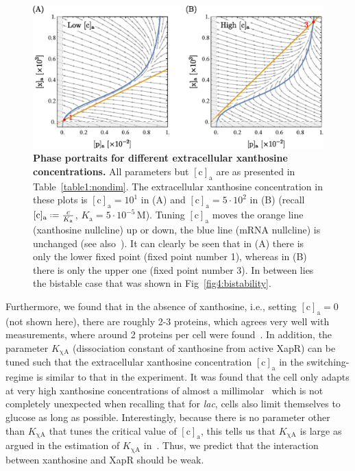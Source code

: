 \documentclass[10pt,letterpaper]{article}
\newcommand{\unit}[1]{\,\mathrm{#1}}
\newcommand{\n}[1]{\mathrm{#1}}
\newcommand*{\defeq}{\mathrel{\vcenter{\baselineskip0.5ex \lineskiplimit0pt
			\hbox{\scriptsize.}\hbox{\scriptsize.}}}%
	=}
\begin{document}
\begin{figure}%
	\centering
	\includegraphics[width=1\textwidth]{media/VaryingC.eps}
	\caption{{\bf Phase portraits for different extracellular xanthosine concentrations.}
		All parameters but $\n{[c]_a}$ are as presented in
		Table~\ref{table1:nondim}. The extracellular xanthosine
		concentration in these plots is $\n{[c]_a}=10^{1}$ in (A) and
		$\n{[c]_a}= 5 \cdot 10^{2}$ in (B) (recall $\n{[c]_{a}} \defeq
		\frac{c}{K_{\n{a}}}$, $K_{\n{a}} = 5 \cdot 10^{-5} \unit{M}$).
		Tuning $\n{[c]_a}$ moves the orange line (xanthosine nullcline) up
		or down, the blue line (mRNA nullcline) is unchanged (see
		also~). It can clearly be seen that in (A) there is
		only the lower fixed point (fixed point number 1), whereas in (B)
		there is only the upper one (fixed point number 3). In between lies
		the bistable case that was shown in Fig~\ref{fig4:bistability}.}
	\label{fig5:extraxanth}
\end{figure}

Furthermore, we found that in the absence of xanthosine, i.e., setting
$\n{[c]_a}=0$ (not shown here), there are roughly 2-3 proteins, which agrees very
well with measurements, where around 2 proteins per cell were
found~\cite{Li2014}. In addition, the parameter $K_{\n{\chi A}}$
(dissociation constant of xanthosine from active XapR) can be tuned such
that the extracellular xanthosine concentration $\n{[c]_a}$ in the
switching-regime is similar to that in the experiment. It was found that the
cell only adapts at very high xanthosine concentrations of almost a
millimolar~\cite{Norholm2001} which is not completely unexpected when
recalling that for \emph{lac}, cells also limit themselves to glucose as
long as possible. Interestingly, because there is no parameter other than
$K_{\n{\chi A}}$ that tunes the critical value of $\n{[c]_a}$, this tells us
that $K_{\n{\chi A}}$ is large as argued in the estimation of $K_{\n{\chi
A}}$ in~. Thus, we predict that the interaction between xanthosine and XapR
should be weak.
\end{document}
